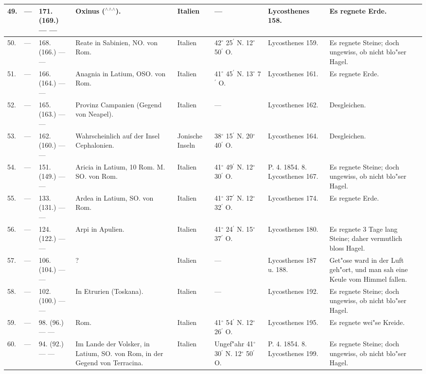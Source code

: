 \documentclass[a4paper, 8pt, oneside, polutonikogreek, german]{article}
\begin{document}
\begin{center}
\begin{longtable}{| p{4mm} | p{2mm} | p{15mm} | p{25mm} | p{16mm} | p{12mm} | p{13mm} | p{20mm} |}
        49. & --- & 171. (169.) --- --- & Oxinus ($^\wedge$$^\wedge$$^\wedge$). & Italien & --- & Lycosthenes 158. & Es regnete Erde. \\ \hline
        50. & --- & 168. (166.) --- --- & Reate in Sabinien, NO. von Rom. & Italien & 42$^\circ$ 25$^\prime$ N. 12$^\circ$ 50$^\prime$ O. & Lycosthenes 159. & Es regnete Steine; doch ungewiss, ob nicht blo"ser Hagel. \\ \hline
        51. & --- & 166. (164.) --- --- & Anagnia in Latium, OSO. von Rom. & Italien & 41$^\circ$ 45$^\prime$ N. 13$^\circ$ 7$^\prime$ O. & Lycosthenes 161. & Es regnete Erde. \\ \hline
        52. & --- & 165. (163.) --- --- & Provinz Campanien (Gegend von Neapel). & Italien & --- & Lycosthenes 162. & Desgleichen. \\ \hline
        53. & --- & 162. (160.) --- --- & Wahrscheinlich auf der Insel Cephalonien. & Jonische Inseln & 38$^\circ$ 15$^\prime$ N. 20$^\circ$ 40$^\prime$ O. & Lycosthenes 164. & Desgleichen. \\ \hline
        54. & --- & 151. (149.) --- --- & Aricia in Latium, 10 Rom. M. SO. von Rom. & Italien & 41$^\circ$ 49$^\prime$ N. 12$^\circ$ 30$^\prime$ O. & P. 4. 1854. 8. Lycosthenes 167. & Es regnete Steine; doch ungewiss, ob nicht blo"ser Hagel. \\ \hline
        55. & --- & 133. (131.) --- --- & Ardea in Latium, SO. von Rom. & Italien & 41$^\circ$ 37$^\prime$ N. 12$^\circ$ 32$^\prime$ O. & Lycosthenes 174. & Es regnete Erde. \\ \hline
        56. & --- & 124. (122.) --- --- & Arpi in Apulien. & Italien & 41$^\circ$ 24$^\prime$ N. 15$^\circ$ 37$^\prime$ O. & Lycosthenes 180. & Es regnete 3 Tage lang Steine; daher vermutlich bloss Hagel. \\ \hline
        57. & --- & 106. (104.) --- --- & ? & Italien & --- & Lycosthenes 187 u. 188. & Get"ose ward in der Luft geh"ort, und man sah eine Keule vom Himmel fallen. \\ \hline
        58. & --- & 102. (100.) --- --- & In Etrurien (Toskana). & Italien & --- & Lycosthenes 192. & Es regnete Steine; doch ungewiss, ob nicht blo"ser Hagel. \\ \hline
        59. & --- & 98. (96.) --- --- & Rom. & Italien & 41$^\circ$ 54$^\prime$ N. 12$^\circ$ 26$^\prime$ O. & Lycosthenes 195. & Es regnete wei"se Kreide. \\ \hline
        60. & --- & 94. (92.) --- --- & Im Lande der Volsker, in Latium, SO. von Rom, in der Gegend von Terracina. & Italien & Ungef"ahr 41$^\circ$ 30$^\prime$ N. 12$^\circ$ 50$^\prime$ O. & P. 4. 1854. 8. Lycosthenes 199. & Es regnete Steine; doch ungewiss, ob nicht blo"ser Hagel. \\ \hline

\end{longtable}
\end{center}
\end{document}
